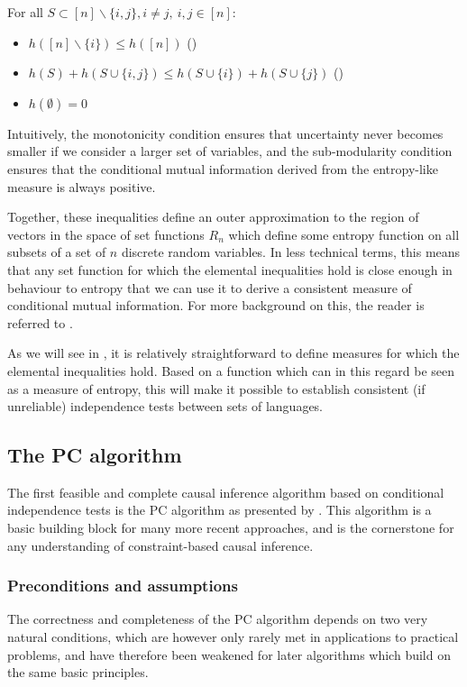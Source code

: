 For all $S \subset [n] \backslash \{i,j\}, i \neq j,\ i,j \in [n]$:
\begin{itemize}
 \item $h([n] \backslash \{i\}) \leq h([n])$ ()
 \item $h(S) + h(S \cup \{i,j\}) \leq h(S \cup \{i\}) + h(S \cup \{j\})$ ()
 \item $h(\emptyset) = 0$
\end{itemize}
Intuitively, the monotonicity condition ensures that uncertainty never becomes smaller if we consider a larger set of variables, and the sub-modularity condition ensures that the conditional mutual information derived from the entropy-like measure is always positive.

Together, these inequalities define an outer approximation to the region of vectors in the space of set functions $R_n$ which define some entropy function on all subsets of a set of $n$ discrete random variables. In less technical terms, this means that any set function for which the elemental inequalities hold is close enough in behaviour to entropy that we can use it to derive a consistent measure of conditional mutual information. For more background on this, the reader is referred to \citet[Ch. 14]{yeung2008}.

As we will see in , it is relatively straightforward to define measures for which the elemental inequalities hold. Based on a function which can in this regard be seen as a measure of entropy, this will make it possible to establish consistent (if unreliable) independence tests between sets of languages.

\subsection{The PC algorithm}\label{sec:3.2.3}
The first feasible and complete causal inference algorithm based on conditional independence tests is the PC algorithm as presented by \cite{spirtes_ea_2000}. This algorithm is a basic building block for many more recent approaches, and is the cornerstone for any understanding of constraint-based causal inference.

\subsubsection{Preconditions and assumptions}
The correctness and completeness of the PC algorithm depends on two very natural conditions, which are however only rarely met in applications to practical problems, and have therefore been weakened for later algorithms which build on the same basic principles.

